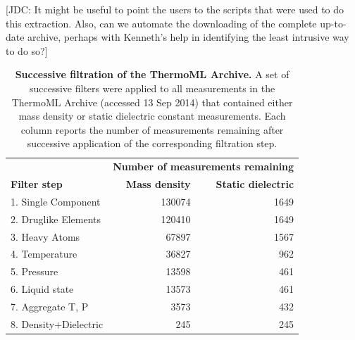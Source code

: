 \documentclass[aps,pre,twocolumn,nofootinbib,superscriptaddress,linenumbers]{revtex4-1}
\begin{document}
{\color{red}[JDC: It might be useful to point the users to the scripts that were used to do this extraction.
Also, can we automate the downloading of the complete up-to-date archive, perhaps with Kenneth's help in identifying the least intrusive way to do so?]}


\begin{table}
\begin{tabular}{lrr}
\hline
 &  \multicolumn{2}{c}{\bf Number of measurements remaining} \\ \cline{2-3}
{\bf Filter step} &  {\bf Mass density} &  {\bf Static dielectric} \\ 
\hline
1.  Single Component   &               130074 &                                     1649 \\
2.  Druglike Elements  &               120410 &                                     1649 \\
3.  Heavy Atoms        &                67897 &                                     1567 \\
4.  Temperature        &                36827 &                                      962 \\
5.  Pressure           &                13598 &                                      461 \\
6.  Liquid state       &                13573 &                                      461 \\
7.  Aggregate T, P     &                 3573 &                                      432 \\
8.  Density+Dielectric &                  245 &                                      245 \\
\hline
\end{tabular}
\caption{{\bf Successive filtration of the ThermoML Archive.}
A set of successive filters were applied to all measurements in the ThermoML Archive (accessed 13 Sep 2014) that contained either mass density or static dielectric constant measurements.
Each column reports the number of measurements remaining after successive application of the corresponding filtration step.}
\label{table:ThermoMLSummary}
\end{table}
\end{document}
